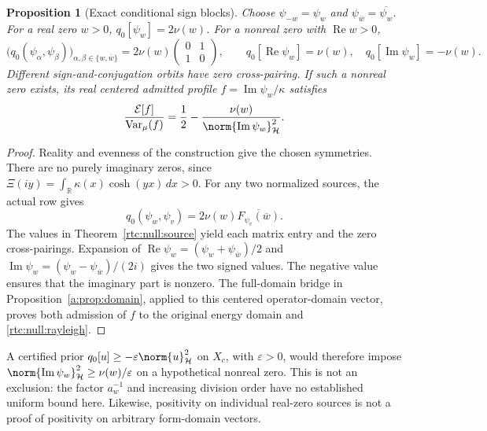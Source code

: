 \documentclass[11pt,a4paper]{article}
\numberwithin{equation}{section}
\newtheorem{proposition}[theorem]{Proposition}
\theoremstyle{definition}\newtheorem{definition}[theorem]{Definition}
\theoremstyle{remark}\newtheorem{remark}[theorem]{Remark}
\newcommand{\R}{\mathbb R}\newcommand{\C}{\mathbb C}\newcommand{\N}{\mathbb N}
\newcommand{\Hh}{\mathcal H}\newcommand{\Hw}{\mathcal H}
\begin{document}
\begin{proposition}[Exact conditional sign blocks]\label{rtc:null:sign}
Choose $\psi_{-w}=\psi_w$ and
$\psi_{\overline w}=\overline{\psi_w}$.
For a real zero $w>0$,
$q_0[\psi_w]=2\nu(w)$.
For a nonreal zero with $\operatorname{Re}w>0$,
\begin{equation}\label{rtc:null:sign-block}
 \bigl(q_0(\psi_\alpha,\psi_\beta)\bigr)_{
             \alpha,\beta\in\{w,\overline w\}}
 =2\nu(w)\begin{pmatrix}0&1\\1&0\end{pmatrix},\qquad
 q_0[\operatorname{Re}\psi_w]=\nu(w),\quad
 q_0[\operatorname{Im}\psi_w]=-\nu(w).
\end{equation}
Different sign-and-conjugation orbits have zero cross-pairing.
If such a nonreal zero exists, its real centered admitted profile
$f=\operatorname{Im}\psi_w/\kappa$ satisfies
\begin{equation}\label{rtc:null:rayleigh}
 \frac{\mathcal E[f]}{\operatorname{Var}_\mu(f)}
 =\frac12-\frac{\nu(w)}{
                \norm{\operatorname{Im}\psi_w}_{\Hh}^2}.
\end{equation}
\end{proposition}
\begin{proof}
Reality and evenness of the construction give the chosen symmetries.
There are no purely imaginary zeros, since
$\Xi(iy)=\int_\R\kappa(x)\cosh(yx)\,dx>0$.
For any two normalized sources, the actual row gives
\[
 q_0(\psi_w,\psi_v)
 =2\nu(w)\overline{F_{\psi_v}(\overline w)}.
\]
The values in Theorem~\ref{rtc:null:source} yield each matrix entry and
the zero cross-pairings.  Expansion of
$\operatorname{Re}\psi_w=(\psi_w+\psi_{\overline w})/2$ and
$\operatorname{Im}\psi_w=(\psi_w-\psi_{\overline w})/(2i)$ gives the
two signed values.  The negative value ensures that the imaginary part
is nonzero.  The full-domain bridge in
Proposition~\ref{a:prop:domain}, applied to this centered operator-domain
vector, proves both admission of $f$ to the original energy domain and
\eqref{rtc:null:rayleigh}.
\end{proof}
A certified prior $q_0[u]\ge-\varepsilon\norm{u}_{\Hh}^2$ on $X_c$,
with $\varepsilon>0$, would therefore impose
$\norm{\operatorname{Im}\psi_w}_{\Hh}^2\ge\nu(w)/\varepsilon$
on a hypothetical nonreal zero.  This is not an exclusion: the factor
$a_w^{-1}$ and increasing division order have no established uniform
bound here.  Likewise, positivity on individual real-zero sources is
not a proof of positivity on arbitrary form-domain vectors.
\end{document}
